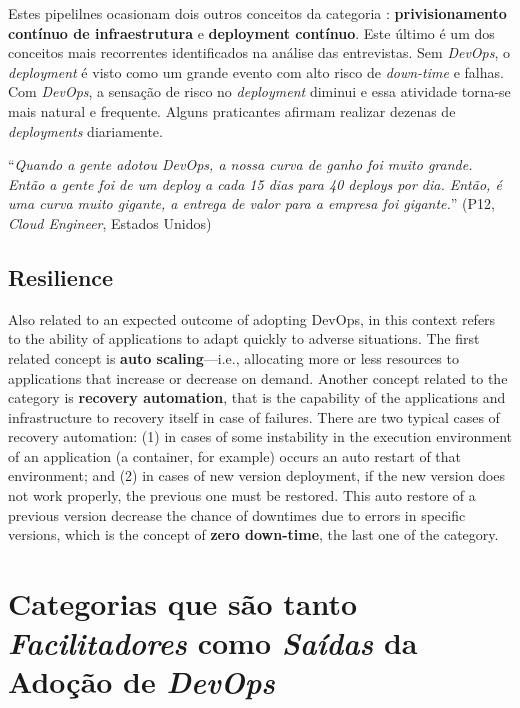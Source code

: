 Estes pipelilnes ocasionam dois outros conceitos da categoria :
{\bf privisionamento contínuo de infraestrutura} e {\bf deployment contínuo}.
Este último é um dos conceitos mais recorrentes identificados na análise das
entrevistas. Sem {\it DevOps}, o {\it deployment} é visto como um grande evento
com alto risco de {\it down-time} e falhas. Com {\it DevOps}, a sensação de
risco no {\it deployment} diminui e essa atividade torna-se mais natural e
frequente. Alguns praticantes afirmam realizar dezenas de {\it deployments}
diariamente.

\begin{mq}
``\emph{Quando a gente adotou DevOps, a nossa curva de ganho foi muito grande.
Então a gente foi de um deploy a cada 15 dias para 40 deploys por dia. Então,
é uma curva muito gigante, a entrega de valor para a empresa foi gigante.}''
(P12, {\it Cloud Engineer}, Estados Unidos)
\end{mq}

\subsection*{Resilience}

Also related to an expected outcome of adopting DevOps,  in this
context refers to the ability of applications to adapt quickly to adverse situations.
The first related concept is \textbf{auto scaling}---i.e.,
allocating more or less resources to applications that increase or
decrease on demand. Another concept related to
the  category is \textbf{recovery automation}, that is
the capability of the applications and infrastructure to recovery itself in case of
failures. There are two typical cases of recovery automation: (1) in cases
of some instability in the execution environment of an application (a
container, for example) occurs an auto restart of that environment; and (2) in
cases of new version deployment, if the new version does not work properly, the
previous one must be restored. This auto restore of a previous version
decrease the chance of downtimes due to errors in specific versions, which
is the concept of \textbf{zero down-time}, the last one of the  category.

\section{Categorias que são tanto \emph{Facilitadores} como \emph{Saídas} da Adoção de \emph{DevOps}}
\label{secao_facilitadores_e_saidas}

